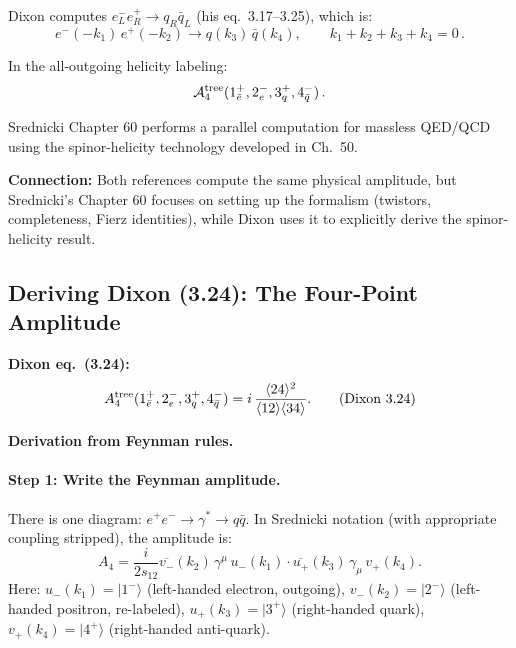 Dixon computes $e^-_L e^+_R\to q_R\bar{q}_L$ (his eq.~3.17--3.25), which is:
\begin{equation}
  e^-(-k_1)\,e^+(-k_2) \to q(k_3)\,\bar{q}(k_4), \qquad k_1+k_2+k_3+k_4=0\,.
  \tag{all-outgoing convention}
\end{equation}

In the all-outgoing helicity labeling:
\begin{equation}
  \mathcal{A}_4^{\rm tree}(1_{\bar{e}}^+, 2_e^-, 3_q^+, 4_{\bar{q}}^-)\,.
\end{equation}

Srednicki Chapter 60 performs a parallel computation for massless QED/QCD
using the spinor-helicity technology developed in Ch.~50.

\textbf{Connection:} Both references compute the same physical amplitude,
but Srednicki's Chapter 60 focuses on setting up the formalism (twistors, completeness,
Fierz identities), while Dixon uses it to explicitly derive the spinor-helicity result.

\subsection{Deriving Dixon (3.24): The Four-Point Amplitude}

\textbf{Dixon eq.~(3.24):}
\begin{equation}
  A_4^{\rm tree}(1_{\bar{e}}^+, 2_e^-, 3_q^+, 4_{\bar{q}}^-)
  = i\,\frac{\langle 24\rangle^2}{\langle 12\rangle\langle 34\rangle}.
  \tag{Dixon 3.24}
\end{equation}

\textbf{Derivation from Feynman rules.}

\paragraph{Step 1: Write the Feynman amplitude.}
There is one diagram: $e^+e^-\to\gamma^*\to q\bar{q}$.
In Srednicki notation (with appropriate coupling stripped), the amplitude is:
\begin{equation}
  A_4 = \frac{i}{2s_{12}}\overline{v_-}(k_2)\,\gamma^\mu\,u_-(k_1)\cdot
  \overline{u_+}(k_3)\,\gamma_\mu\,v_+(k_4).
\end{equation}
Here: $u_-(k_1)=|1^-\rangle$ (left-handed electron, outgoing), $v_-(k_2)=|2^-\rangle$
(left-handed positron, re-labeled), $u_+(k_3)=|3^+\rangle$ (right-handed quark),
$v_+(k_4)=|4^+\rangle$ (right-handed anti-quark).

